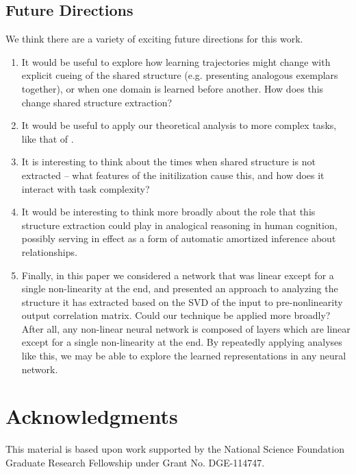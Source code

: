 \documentclass[10pt,letterpaper]{article}
\begin{document}
\subsection{Future Directions}
We think there are a variety of exciting future directions for this work. 
\begin{enumerate}
\item It would be useful to explore how learning trajectories might change with explicit cueing of the shared structure (e.g. presenting analogous exemplars together), or when one domain is learned before another. How does this change shared structure extraction?
\item It would be useful to apply our theoretical analysis to more complex tasks, like that of \citet{Hinton1986}. 
\item It is interesting to think about the times when shared structure is not extracted -- what features of the initilization cause this, and how does it interact with task complexity?
\item It would be interesting to think more broadly about the role that this structure extraction could play in analogical reasoning in human cognition, possibly serving in effect as a form of automatic amortized inference about relationships.
\item Finally, in this paper we considered a network that was linear except for a single non-linearity at the end, and presented an approach to analyzing the structure it has extracted based on the SVD of the input to pre-nonlinearity output correlation matrix. Could our technique be applied more broadly? After all, any non-linear neural network is composed of layers which are linear except for a single non-linearity at the end. By repeatedly applying analyses like this, we may be able to explore the learned representations in any neural network.
\end{enumerate}
\section{Acknowledgments}
This material is based upon work supported by the National Science Foundation Graduate Research Fellowship under Grant No. DGE-114747.


\setlength{\bibleftmargin}{.125in}
\setlength{\bibindent}{-\bibleftmargin}


\end{document}

